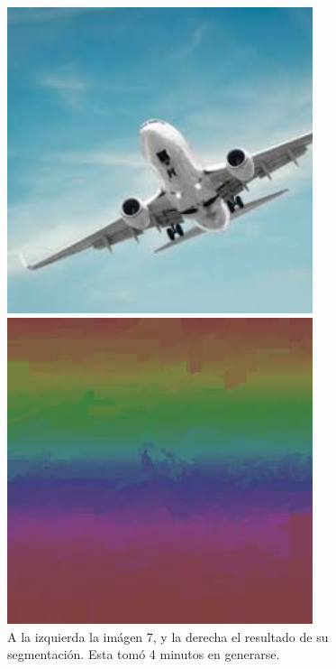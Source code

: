 \documentclass[letterpaper,11pt]{article} %
\begin{document}
      \begin{figure}[H]
        \centering
        \begin{minipage}{0.4\textwidth}
          \includegraphics[width=0.8\textwidth]{images/image_7}
        \end{minipage}
        \begin{minipage}{0.4\textwidth}
          \includegraphics[width=0.8\textwidth]{images/result_image7}
        \end{minipage}
        \caption{A la izquierda la imágen 7, y la derecha el resultado de su segmentación. Esta tomó 4 minutos en generarse.}
      \end{figure}
\end{document}
